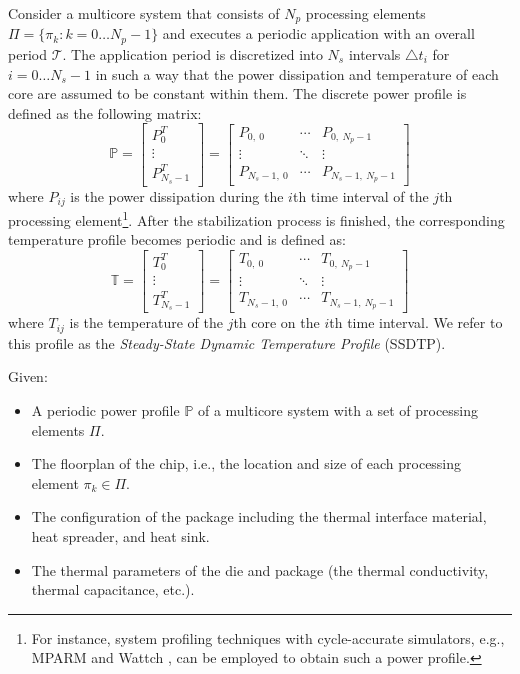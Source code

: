 Consider a multicore system that consists of $N_p$ processing elements $\Pi = \{ \pi_k: k = 0 \dots N_p - 1 \}$ and executes a periodic application with an overall period $\mathcal{T}$. The application period is discretized into $N_s$ intervals $\triangle t_i$ for $i = 0 \dots N_s - 1$ in such a way that the power dissipation and temperature of each core are assumed to be constant within them. The discrete power profile is defined as the following matrix:
\begin{equation*}
  \mathbb{P} = \left[
    \begin{array}{c}
      P_0^T \\
      \vdots \\
      P_{N_s - 1}^T
    \end{array}
  \right] = \left[
    \begin{array}{ccc}
      P_{0, \: 0} & \cdots & P_{0, \: N_p - 1} \\
      \vdots & \ddots & \vdots \\
      P_{N_s - 1, \: 0} & \cdots & P_{N_s - 1, \: N_p - 1}
    \end{array}
  \right]
\end{equation*}
where $P_{ij}$ is the power dissipation during the $i$th time interval of the $j$th processing element\footnote{For instance, system profiling techniques with cycle-accurate simulators, e.g., MPARM \cite{benini2005} and Wattch \cite{brooks2000}, can be employed to obtain such a power profile.}. After the stabilization process is finished, the corresponding temperature profile becomes periodic and is defined as:
\begin{equation*}
  \mathbb{T} = \left[
    \begin{array}{c}
      T_0^T \\
      \vdots \\
      T_{N_s - 1}^T
    \end{array}
  \right] = \left[
    \begin{array}{ccc}
      T_{0, \: 0} & \cdots & T_{0, \: N_p - 1} \\
      \vdots & \ddots & \vdots \\
      T_{N_s - 1, \: 0} & \cdots & T_{N_s - 1, \: N_p - 1}
    \end{array}
  \right]
\end{equation*}
where $T_{ij}$ is the temperature of the $j$th core on the $i$th time interval. We refer to this profile as the \emph{Steady-State Dynamic Temperature Profile} (SSDTP).

Given:
\begin{itemize}
  \item A periodic power profile $\mathbb{P}$ of a multicore system with a set of processing elements $\Pi$.
  \item The floorplan of the chip, i.e., the location and size of each processing element $\pi_k \in \Pi$.
  \item The configuration of the package including the thermal interface material, heat spreader, and heat sink.
  \item The thermal parameters of the die and package (the thermal conductivity, thermal capacitance, etc.).
\end{itemize}

